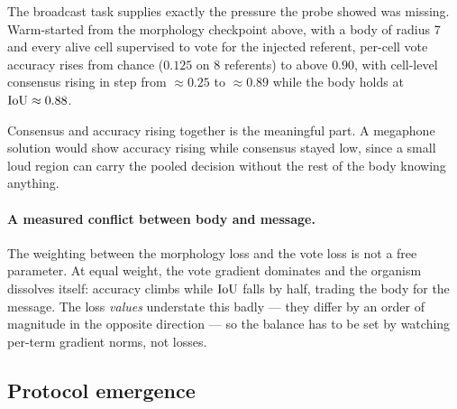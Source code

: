 
The broadcast task supplies exactly the pressure the probe showed was missing.
Warm-started from the morphology checkpoint above, with a body of radius 7 and
every alive cell supervised to vote for the injected referent, per-cell vote
accuracy rises from chance ($0.125$ on 8 referents) to above $0.90$, with
cell-level consensus rising in step from $\approx0.25$ to $\approx0.89$ while the
body holds at $\mathrm{IoU} \approx 0.88$.

Consensus and accuracy rising together is the meaningful part. A megaphone
solution would show accuracy rising while consensus stayed low, since a small
loud region can carry the pooled decision without the rest of the body knowing
anything. 

\paragraph{A measured conflict between body and message.} The weighting between
the morphology loss and the vote loss is not a free parameter. At equal weight,
the vote gradient dominates and the organism dissolves itself: accuracy climbs
while $\mathrm{IoU}$ falls by half, trading the body for the message. The loss
\emph{values} understate this badly --- they differ by an order of magnitude in
the opposite direction --- so the balance has to be set by watching per-term
gradient norms, not losses. 

\subsection{Protocol emergence}
\label{sec:results-emergence}


